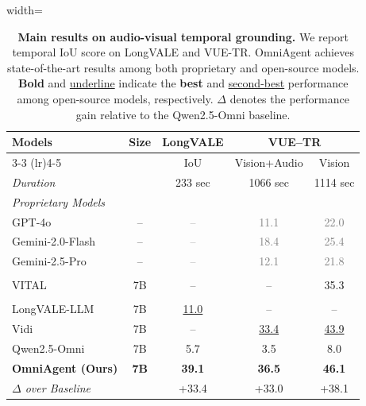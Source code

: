 \documentclass{article}
\theoremstyle{plain}
\theoremstyle{definition}
\theoremstyle{remark}
\newcommand{\gv}[1]{\textcolor{gray}{#1}}
\begin{document}
\begin{table}[t]
\caption{\textbf{Main results on audio-visual temporal grounding.} We report temporal IoU score on LongVALE and VUE-TR. OmniAgent achieves state-of-the-art results among both proprietary and open-source models. \textbf{Bold} and \underline{underline} indicate the \textbf{best} and \underline{second-best} performance among open-source models, respectively. $\Delta$ denotes the performance gain relative to the Qwen2.5-Omni baseline.}
\label{tab:temporal-grounding-results}
\vspace{-2mm}
\begin{center}
\begin{normalsize}
\begin{adjustbox}{width=\columnwidth}
\setlength{\tabcolsep}{6pt} 
\renewcommand{\arraystretch}{1.1}
\begin{tabular}{l c c cc}
\toprule

\multirow{3}{*}{\textbf{Models}} & 
\multirow{3}{*}{\textbf{Size}} & \textbf{LongVALE} & \multicolumn{2}{c}{\textbf{VUE--TR}} \\
\cmidrule(lr){3-3} \cmidrule(lr){4-5}

& & IoU & Vision+Audio & Vision \\
\midrule

\textit{Duration} & &  233 sec &  1066 sec &  1114 sec \\
\midrule

\multicolumn{5}{l}{\textit{Proprietary Models}} \\
GPT-4o~\cite{gpt4o} & -- & \gv{--} & \gv{11.1} & \gv{22.0} \\
Gemini-2.0-Flash~\cite{gemini} & -- & \gv{--} & \gv{18.4} & \gv{25.4} \\
Gemini-2.5-Pro~\cite{comanici2025gemini} & -- & \gv{--} & \gv{12.1} & \gv{21.8} \\
\midrule \addlinespace[0.2em]

\multicolumn{5}{l}{\textit{Open-Source Agentic Models}} \\
VITAL~\cite{vital} & 7B & -- & -- & 35.3 \\
\midrule \addlinespace[0.2em]

\multicolumn{5}{l}{\textit{Open-Source Models}} \\
LongVALE-LLM~\cite{geng2025longvale} & 7B & \underline{11.0} & -- & -- \\
Vidi~\cite{team2025vidi} & 7B & -- & \underline{33.4} & \underline{43.9} \\
Qwen2.5-Omni~\cite{qwen2.5omni} & 7B & 5.7 & 3.5 & 8.0 \\
\midrule \addlinespace[0.3em]

\textbf{OmniAgent (Ours)} & \textbf{7B} & \textbf{39.1} & \textbf{36.5} & \textbf{46.1} \\
\multicolumn{2}{l}{\quad \textit{$\Delta$ over Baseline}} & +33.4 & +33.0 & +38.1 \\
\bottomrule
\end{tabular}
\end{adjustbox}
\end{normalsize}
\end{center}
\vskip -0.2in
\end{table}
\end{document}
